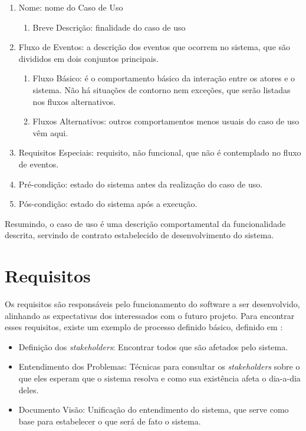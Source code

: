 \begin{enumerate}
    \item Nome: nome do Caso de Uso
    \begin{enumerate}
        \item Breve Descrição: finalidade do caso de uso
    \end{enumerate}
    \item Fluxo de Eventos: a descrição dos eventos que ocorrem no sistema, que são divididos em dois conjuntos principais.
    \begin{enumerate}
        \item Fluxo Básico: é o comportamento básico da interação entre os atores e o sistema. Não há situações de contorno nem exceções, que serão listadas nos fluxos alternativos.
        \item Fluxos Alternativos: outros comportamentos menos usuais do caso de uso vêm aqui.
    \end{enumerate}
    \item Requisitos Especiais: requisito, não funcional, que não é contemplado no fluxo de eventos.
    \item Pré-condição: estado do sistema antes da realização do caso de uso.
    \item Pós-condição: estado do sistema após a execução.
\end{enumerate}

Resumindo, o caso de uso é uma descrição comportamental da funcionalidade descrita, servindo de contrato estabelecido de desenvolvimento do sistema.

\section{Requisitos}
Os requisitos são responsáveis pelo funcionamento do software a ser desenvolvido, alinhando as expectativas dos interessados com o futuro projeto. Para encontrar esses requisitos, existe um  exemplo de processo definido básico, definido em \cite{kurtbittnerianspence2002}:

\begin{itemize}
    \item Definição dos \textit{stakeholders}: Encontrar todos que são afetados pelo sistema.
    \item Entendimento dos Problemas: Técnicas para consultar os \textit{stakeholders} sobre o que eles esperam que o sistema resolva e como sua existência afeta o dia-a-dia deles.
    \item Documento Visão: Unificação do entendimento do sistema, que serve como base para estabelecer o que será de fato o sistema.
\end{itemize}

